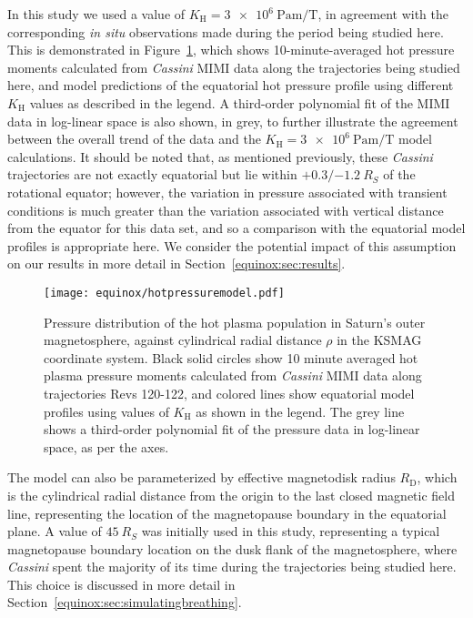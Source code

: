 In this study we used a value of $K_\mathrm{H} = \SI{3e6}{\pascal\m\per\tesla}$, in agreement with the corresponding \textit{in situ} observations made during the period being studied here. This is demonstrated in Figure~\ref{equinox:fig:hotpressuremodel}, which shows 10-minute-averaged hot pressure moments calculated from \textit{Cassini} MIMI data along the trajectories being studied here, and model predictions of the equatorial hot pressure profile using different $K_\mathrm{H}$ values as described in the legend. A third-order polynomial fit of the MIMI data in log-linear space is also shown, in grey, to further illustrate the agreement between the overall trend of the data and the $K_\mathrm{H} = \SI{3e6}{\pascal\m\per\tesla}$ model calculations. It should be noted that, as mentioned previously, these \textit{Cassini} trajectories are not exactly equatorial but lie within $+0.3/\SI{-1.2}{R_S}$ of the rotational equator; however, the variation in pressure associated with transient conditions is much greater than the variation associated with vertical distance from the equator for this data set, and so a comparison with the equatorial model profiles is appropriate here. We consider the potential impact of this assumption on our results in more detail in Section~\ref{equinox:sec:results}.
\begin{figure}
\centering
\texttt{[image: equinox/hotpressuremodel.pdf]}
\caption[Equatorial hot plasma pressure from \textit{Cassini} MIMI, and model predictions for different $K_\mathrm{H}$ values.]{Pressure distribution of the hot plasma population in Saturn's outer magnetosphere, against cylindrical radial distance $\rho$ in the KSMAG coordinate system. Black solid circles show 10 minute averaged hot plasma pressure moments calculated from \textit{Cassini} MIMI data along trajectories Revs 120-122, and colored lines show equatorial model profiles using values of $K_\mathrm{H}$ as shown in the legend. The grey line shows a third-order polynomial fit of the pressure data in log-linear space, as per the axes.}
\label{equinox:fig:hotpressuremodel}
\end{figure}

The model can also be parameterized by effective magnetodisk radius $R_\mathrm{D}$, which is the cylindrical radial distance from the origin to the last closed magnetic field line, representing the location of the magnetopause boundary in the equatorial plane. A value of $\SI{45}{R_S}$ was initially used in this study, representing a typical magnetopause boundary location on the dusk flank of the magnetosphere, where \textit{Cassini} spent the majority of its time during the trajectories being studied here. This choice is discussed in more detail in Section~\ref{equinox:sec:simulatingbreathing}.

